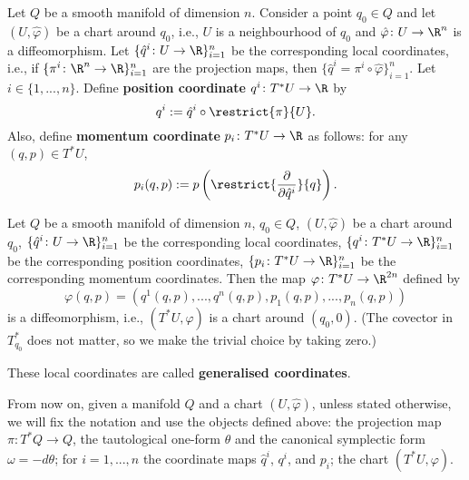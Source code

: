 \begin{definition}
  Let $Q$ be a smooth manifold of dimension $n$.
  Consider a point $q_0 \in Q$ and let $(U, \hat{\varphi})$ be a chart around
  $q_0$, i.e., $U$ is a neighbourhood of $q_0$ and
  $\hat{\varphi} \colon U \to \R^n$ is a diffeomorphism.
  Let $\{\hat{q}^i \colon U \to \R\}_{i = 1}^n$ be the corresponding local
  coordinates, i.e., if $\{\pi^i \colon \R^n \to \R\}_{i = 1}^n$ are the
  projection maps, then $\{\hat{q}^i = \pi^i \circ \hat{\varphi}\}_{i = 1}^n$.
  Let $i \in \{1, ..., n\}$.
  Define \textbf{position coordinate} $q^i \colon T^* U \to \R$ by
  \begin{equation}
    q^i := \hat{q}^i \circ \restrict{\pi}{U}.
  \end{equation}
  Also, define \textbf{momentum coordinate} $p_i \colon T^* U \to \R$
  as follows: for any $(q, p) \in T^* U$,
  \begin{equation}
    p_i(q, p)
    := p\left(\restrict{\frac{\partial}{\partial \hat{q}^i}}{q}\right).
  \end{equation}
\end{definition}
\begin{proposition}
  Let
    $Q$ be a smooth manifold of dimension $n$,
    $q_0 \in Q$,
    $(U, \hat{\varphi})$ be a chart around $q_0$,
    $\{\hat{q}^i \colon U \to \R\}_{i = 1}^n$ be the corresponding local
      coordinates,
    $\{q^i \colon T^* U \to \R\}_{i = 1}^n$ be the corresponding position
      coordinates,
    $\{p_i \colon T^* U \to \R\}_{i = 1}^n$ be the corresponding momentum
      coordinates.
  Then the map $\varphi \colon T^* U \to \R^{2 n}$ defined by
  \begin{equation}
    \varphi(q, p) = (q^1(q, p), ..., q^n(q, p), p_1(q, p), ..., p_n(q, p))
  \end{equation}
  is a diffeomorphism, i.e., $(T^* U, \varphi)$ is a chart around $(q_0, 0)$.
  (The covector in $T^*_{q_0}$ does not matter, so we make the trivial choice by
  taking zero.)

  These local coordinates are called \textbf{generalised coordinates}.
\end{proposition}
\begin{remark}
  From now on, given a manifold $Q$ and a chart $(U, \hat{\varphi})$, unless
  stated otherwise, we will fix the notation and use the objects defined above:
  the projection map $\pi \colon T^* Q \to Q$, the tautological one-form
  $\theta$ and the canonical symplectic form $\omega = - d \theta$;
  for $i = 1, ..., n$ the coordinate maps $\hat{q}^i$, $q^i$, and $p_i$;
  the chart $(T^* U, \varphi)$.
\end{remark}
